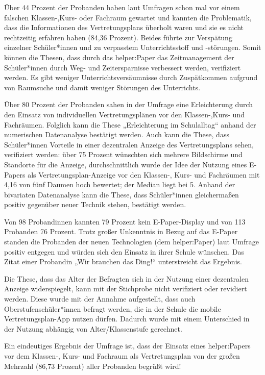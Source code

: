 \documentclass[10pt]{article}
\begin{document}
Über 44 Prozent der Probanden haben laut Umfragen schon mal vor einem falschen Klassen-,Kurs- oder Fachraum gewartet und kannten die Problematik, dass die Informationen des Vertretungsplans überholt waren und sie es nicht rechtzeitig erfahren haben (84,36 Prozent). Beides führte zur Verspätung einzelner Schüler*innen und zu verpasstem Unterrichtsstoff und -störungen. Somit können die Thesen, dass durch das helper:Paper das Zeitmanagement der Schüler*innen durch Weg- und Zeitersparnisse verbessert werden, verifiziert werden. Es gibt weniger Unterrichtsversäumnisse durch Zuspätkommen aufgrund von Raumsuche und damit weniger Störungen des Unterrichts. 

Über 80 Prozent der Probanden sahen in der Umfrage eine Erleichterung durch den Einsatz von individuellen Vertretungsplänen vor den Klassen-,Kurs- und Fachräumen. Folglich kann die These „Erleichterung im Schulalltag“ anhand der numerischen Datenanalyse bestätigt werden.
Auch kann die These, dass Schüler*innen Vorteile in einer dezentralen Anzeige des Vertretungsplans sehen, verifiziert werden: über 75 Prozent wünschten sich mehrere Bildschirme und Standorte für die Anzeige, durchschnittlich wurde der Idee der Nutzung eines E-Papers als Vertretungsplan-Anzeige vor den Klassen-, Kurs- und Fachräumen mit 4,16 von fünf Daumen hoch bewertet; der Median liegt bei 5. 
Anhand der bivariaten Datenanalyse kann die These, dass Schüler*innen gleichermaßen positiv gegenüber neuer Technik stehen, bestätigt werden. 

Von 98 Probandinnen kannten 79 Prozent kein E-Paper-Display und von 113 Probanden 76 Prozent. 
Trotz großer Unkenntnis in Bezug auf das E-Paper standen die Probanden der neuen Technologien (dem helper:Paper) laut Umfrage positiv entgegen und würden sich den Einsatz in ihrer Schule wünschen. Das Zitat einer Probandin „Wir brauchen das Ding!“ unterstreicht das Ergebnis.

Die These, dass das Alter der Befragten sich in der Nutzung einer dezentralen Anzeige widerspiegelt, kann mit der Stichprobe nicht verifiziert oder revidiert werden. Diese wurde mit der Annahme aufgestellt, dass auch Oberstufenschüler*innen befragt werden, die in der Schule die mobile Vertretungsplan-App nutzen dürfen. Dadurch wurde mit einem Unterschied in der Nutzung abhängig von Alter/Klassenstufe gerechnet. 

Ein eindeutiges Ergebnis der Umfrage ist, dass der Einsatz eines helper:Papers vor dem Klassen-, Kurs- und Fachraum als Vertretungsplan von der großen Mehrzahl (86,73 Prozent) aller Probanden begrüßt wird!
\end{document}
